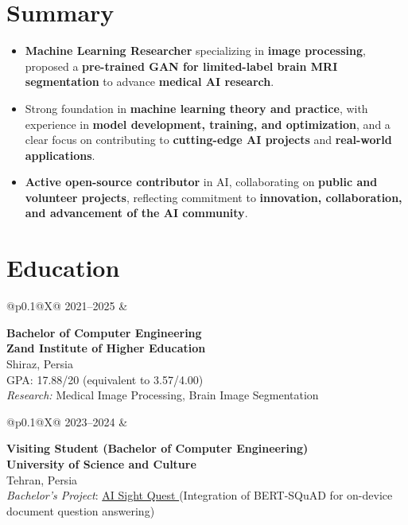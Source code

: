\documentclass[letter,10pt]{article}
\makeatletter
\newcommand{\cventry}[2]{%
    \noindent
    \begin{tabularx}{\textwidth}{%
        @{}p{0.1\textwidth}@{\hspace{0.2cm}}X@{}
    }
        #1 &
        \begin{minipage}[t]{\linewidth}
            #2
        \end{minipage}
    \end{tabularx}%
    \par\vspace{1.1em}%
}
\makeatother
\begin{document}
\vspace*{16pt}

\section*{Summary}
\begin{itemize}[nosep, leftmargin=*, itemsep=4.5pt]
    \item \textbf{Machine Learning Researcher} specializing in \textbf{image processing}, proposed a \textbf{pre-trained GAN for limited-label brain MRI segmentation} to advance \textbf{medical AI research}.
    \item Strong foundation in \textbf{machine learning theory and practice}, with experience in \textbf{model development, training, and optimization}, and a clear focus on contributing to \textbf{cutting-edge AI projects} and \textbf{real-world applications}.
    \item \textbf{Active open-source contributor} in AI, collaborating on \textbf{public and volunteer projects}, reflecting commitment to \textbf{innovation, collaboration, and advancement of the AI community}.
\end{itemize}

\section*{Education}
\cventry{2021--2025}{
    \textbf{Bachelor of Computer Engineering}\\
    \textbf{Zand Institute of Higher Education}\\
    Shiraz, Persia\\
    GPA: 17.88/20 (equivalent to 3.57/4.00)\\
    \textit{Research:} Medical Image Processing, Brain Image Segmentation
}

\cventry{2023--2024}{
    \textbf{Visiting Student (Bachelor of Computer Engineering)}\\
    \textbf{University of Science and Culture}\\
    Tehran, Persia\\
    \textit{Bachelor’s Project}: \href{https://github.com/karami-mehdi/AISightQuest}{ AI Sight Quest } (Integration of BERT-SQuAD for on-device document question answering) \\[-20pt]
}
\end{document}
